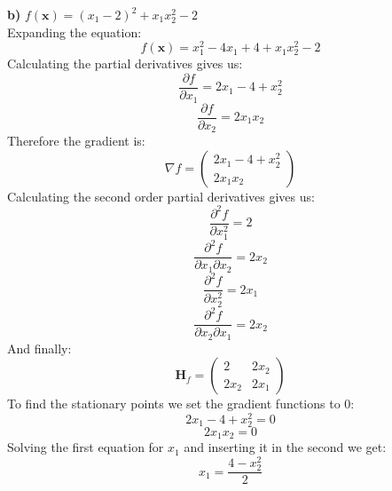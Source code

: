 \documentclass{article}
\begin{document}
\textbf{b)} $f(\boldsymbol{x}) = (x_1 - 2)^2 + x_1x_2^2 - 2$\\
Expanding the equation:
\begin{equation*}
    f(\boldsymbol{x}) = x_1^2 - 4x_1 + 4 + x_1x_2^2 - 2
\end{equation*}
Calculating the partial derivatives gives us:
\begin{equation*}
    \frac{\partial f}{\partial x_1} = 2x_1 - 4 + x_2^2
\end{equation*}
\begin{equation*}
    \frac{\partial f}{\partial x_2} = 2x_1x_2
\end{equation*}
Therefore the gradient is:
\begin{equation*}
    \nabla f = \begin{pmatrix} 2x_1 - 4 + x_2^2\\ 2x_1x_2\end{pmatrix}
\end{equation*}
Calculating the second order partial derivatives gives us:
\begin{equation*}
    \frac{\partial ^2 f}{\partial x_1^2} = 2
\end{equation*}
\begin{equation*}
    \frac{\partial ^2 f}{\partial x_1 \partial x_2} = 2x_2
\end{equation*}
\begin{equation*}
    \frac{\partial ^2 f}{\partial x_2^2} = 2x_1
\end{equation*}
\begin{equation*}
    \frac{\partial ^2 f}{\partial x_2 \partial x_1} = 2x_2
\end{equation*}
And finally:
\begin{equation}
\label{1b_hess}
    \textbf{H}_f = \begin{pmatrix} 2 & 2x_2 \\ 2x_2 & 2x_1 \end{pmatrix}
\end{equation}
To find the stationary points we set the gradient functions to 0:
\begin{equation*}
    2x_1 - 4 + x_2^2 = 0
\end{equation*}
\begin{equation*}
    2x_1x_2 = 0
\end{equation*}
Solving the first equation for $x_1$ and inserting it in the second we get:
\begin{equation}
\label{1b_for_x1}
    x_1 = \frac{4-x_2^2}{2}
\end{equation}
\end{document}
